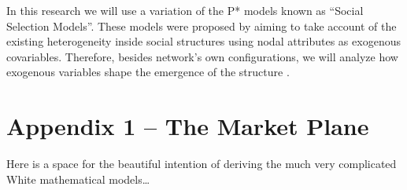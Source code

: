 \documentclass[a4paper, 12pt, openright, oneside, german, french, brazil, english, article]{abntex2}
\begin{document}
	
	In this research we will use a variation of the P* models known as ``Social Selection Models''. These models were proposed by  aiming to take account of the existing heterogeneity inside social structures using nodal attributes as exogenous covariables. Therefore, besides network's own configurations, we will analyze how exogenous variables shape the emergence of the structure \cite{wang2016social}.
	
	
	
	
	
	
	
	
\postextual
\anexos

	


	\newpage
	\section*{Appendix 1 -- The Market Plane}
	Here is a space for the beautiful intention of deriving the much very complicated White mathematical models\dots
\end{document}
